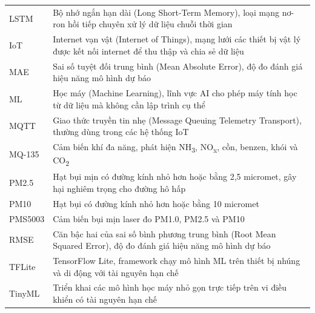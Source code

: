 \begin{longtable}{p{3cm} p{11cm}}
LSTM    & Bộ nhớ ngắn hạn dài (Long Short-Term Memory), loại mạng nơ-ron
          hồi tiếp chuyên xử lý dữ liệu chuỗi thời gian \\[4pt]

IoT     & Internet vạn vật (Internet of Things), mạng lưới các thiết bị
          vật lý được kết nối internet để thu thập và chia sẻ dữ liệu \\[4pt]

MAE     & Sai số tuyệt đối trung bình (Mean Absolute Error), độ đo đánh
          giá hiệu năng mô hình dự báo \\[4pt]

ML      & Học máy (Machine Learning), lĩnh vực AI cho phép máy tính học
          từ dữ liệu mà không cần lập trình cụ thể \\[4pt]

MQTT    & Giao thức truyền tin nhẹ (Message Queuing Telemetry Transport),
          thường dùng trong các hệ thống IoT \\[4pt]

MQ-135  & Cảm biến khí đa năng, phát hiện NH\textsubscript{3}, NO\textsubscript{x},
          cồn, benzen, khói và CO\textsubscript{2} \\[4pt]

PM2.5   & Hạt bụi mịn có đường kính nhỏ hơn hoặc bằng 2{,}5 micromet,
          gây hại nghiêm trọng cho đường hô hấp \\[4pt]

PM10    & Hạt bụi có đường kính nhỏ hơn hoặc bằng 10 micromet \\[4pt]

PMS5003 & Cảm biến bụi mịn laser đo PM1.0, PM2.5 và PM10 \\[4pt]

RMSE    & Căn bậc hai của sai số bình phương trung bình (Root Mean Squared
          Error), độ đo đánh giá hiệu năng mô hình dự báo \\[4pt]

TFLite  & TensorFlow Lite, framework chạy mô hình ML trên thiết bị nhúng
          và di động với tài nguyên hạn chế \\[4pt]

TinyML  & Triển khai các mô hình học máy nhỏ gọn trực tiếp trên vi điều
          khiển có tài nguyên hạn chế \\[4pt]

\end{longtable}
